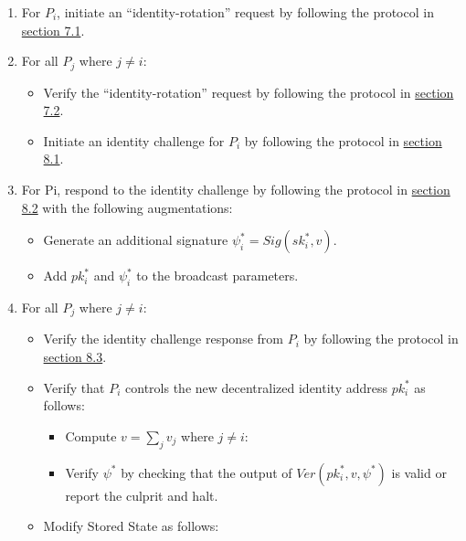 \documentclass[
]{article}
\providecommand{\tightlist}{%
  \setlength{\itemsep}{0pt}\setlength{\parskip}{0pt}}
\begin{document}
\begin{enumerate}
\def\labelenumi{\arabic{enumi}.}
\tightlist
\item
  For \(P_i\), initiate an ``identity-rotation'' request by following
  the protocol in
  \protect\hyperlink{identity-authed-request-initiation}{section 7.1}.
\item
  For all \(P_j\) where \(j \neq i\):

  \begin{itemize}
  \tightlist
  \item
    Verify the ``identity-rotation'' request by following the protocol
    in \protect\hyperlink{identity-authed-request-verification}{section
    7.2}.
  \item
    Initiate an identity challenge for \(P_i\) by following the protocol
    in \protect\hyperlink{identity-challenge-initiation}{section 8.1}.
  \end{itemize}
\item
  For Pi, respond to the identity challenge by following the protocol in
  \protect\hyperlink{identity-challenge-response}{section 8.2} with the
  following augmentations:

  \begin{itemize}
  \tightlist
  \item
    Generate an additional signature
    \(\psi _i^ \ast = Sig(sk_i^ \ast, v)\).
  \item
    Add \(pk_i^ \ast\) and \(\psi _i^ \ast\) to the broadcast
    parameters.
  \end{itemize}
\item
  For all \(P_j\) where \(j \neq i\):

  \begin{itemize}
  \tightlist
  \item
    Verify the identity challenge response from \(P_i\) by following the
    protocol in
    \protect\hyperlink{identity-challenge-verification}{section 8.3}.
  \item
    Verify that \(P_i\) controls the new decentralized identity address
    \(pk_i^ \ast\) as follows:

    \begin{itemize}
    \tightlist
    \item
      Compute \(v = \sum _j v_j\) where \(j \neq i\):
    \item
      Verify \(\psi ^ \ast\) by checking that the output of
      \(Ver(pk_i^ \ast, v, \psi ^ \ast)\) is valid or report the culprit
      and halt.
    \end{itemize}
  \item
    Modify Stored State as follows:


\end{itemize}
\end{enumerate}
\end{document}
